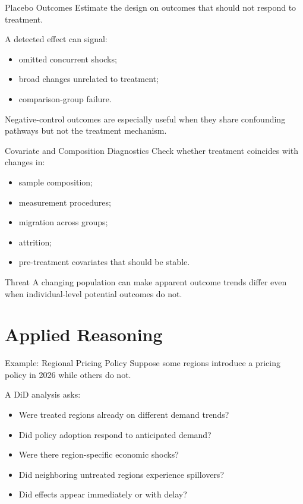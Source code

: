 \documentclass[aspectratio=169,11pt]{beamer}
\begin{document}
\begin{frame}{Placebo Outcomes}
Estimate the design on outcomes that should not respond to treatment.

A detected effect can signal:
\begin{itemize}
\item omitted concurrent shocks;
\item broad changes unrelated to treatment;
\item comparison-group failure.
\end{itemize}

Negative-control outcomes are especially useful when they share confounding pathways but not the treatment mechanism.
\end{frame}

\begin{frame}{Covariate and Composition Diagnostics}
Check whether treatment coincides with changes in:
\begin{itemize}
\item sample composition;
\item measurement procedures;
\item migration across groups;
\item attrition;
\item pre-treatment covariates that should be stable.
\end{itemize}

\begin{alertblock}{Threat}
A changing population can make apparent outcome trends differ even when individual-level potential outcomes do not.
\end{alertblock}
\end{frame}

\section{Applied Reasoning}

\begin{frame}{Example: Regional Pricing Policy}
Suppose some regions introduce a pricing policy in 2026 while others do not.

A DiD analysis asks:
\begin{itemize}
\item Were treated regions already on different demand trends?
\item Did policy adoption respond to anticipated demand?
\item Were there region-specific economic shocks?
\item Did neighboring untreated regions experience spillovers?
\item Did effects appear immediately or with delay?
\end{itemize}
\end{frame}
\end{document}
